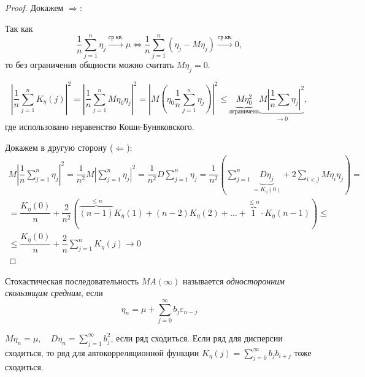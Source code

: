 \begin{proof}
  Докажем $\Rightarrow$:

  Так как
  \[
    \dfrac{1}{n} \sum_{j=1}^n \eta_j \xrightarrow{\text{ср.кв.}} \mu 
    \Leftrightarrow
    \dfrac{1}{n} \sum_{j=1}^n (\eta_j - M\eta_j) \xrightarrow{\text{ср.кв.}} 0,
  \]
  то без ограничения общности можно считать $M\eta_j = 0$.

  \[
    \left| \dfrac{1}{n} \sum_{j=1}^n K_\eta(j) \right|^2 =
    \left| \dfrac{1}{n} \sum_{j=1}^n M\eta_0 \eta_j \right|^2 = 
    \left| M \left( \eta_0 \dfrac{1}{n} \sum_{j=1}^n \eta_j \right)  \right|^2 \leqslant 
    \underbrace{M\eta_0^2}_\text{ограничено} \underbrace{M \left|\dfrac{1}{n} \sum \eta_j \right|^2}_{\to 0},
  \]
  где использовано неравенство Коши-Буняковского.

  Докажем в другую сторону ($\Leftarrow$):
  \begin{multline*}
    M \left| \dfrac{1}{n} \sum_{j=1}^n \eta_j \right|^2 =
    \dfrac{1}{n^2} M \left| \sum_{j=1}^n \eta_j \right|^2 = \dfrac{1}{n^2} D \sum_{j=1}^n \eta_j =
    \dfrac{1}{n^2} \left( \sum_{j=1}^n \underbrace{D\eta_j}_{= K_\eta(0)} + 2 \sum_{i<j} M\eta_i \eta_j \right) = \\
    = \dfrac{K_\eta(0)}{n} + \dfrac{2}{n^2} \left( \overbrace{(n-1)}^{\leqslant n} K_\eta(1) + (n-2) K_\eta(2) + \dots + \overbrace{1}^{\leqslant n} \cdot K_\eta(n-1) \right) \leqslant \\
    \leqslant \dfrac{K_\eta(0)}{n} + \dfrac{2}{n} \sum_{j=1}^n K_\eta(j) \to 0
  \end{multline*}
\end{proof}


\begin{definition}
  Стохастическая последовательность $MA(\infty)$ называется \emph{односторонним скользящим средним}, если
  \[
    \eta_n = \mu + \sum_{j=0}^\infty b_j \varepsilon_{n-j}
  \]
\end{definition}

$M\eta_n = \mu, \quad D\eta_n = \sum_{j=1}^\infty b_j^2$, если ряд сходиться.
Если ряд для дисперсии сходиться, то ряд для автокорреляционной функции
$K_\eta(j) = \sum_{j=0}^\infty b_j b_{i+j}$ тоже сходиться.


